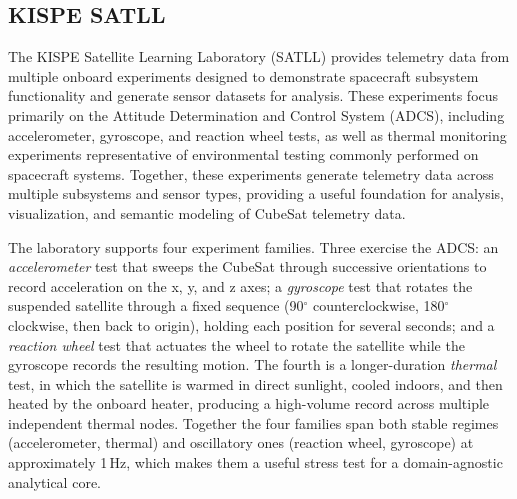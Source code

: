 \documentclass[conference]{IEEEtran}
\begin{document}
\subsection{KISPE SATLL}

The KISPE Satellite Learning Laboratory (SATLL) provides telemetry data from multiple onboard experiments designed to demonstrate spacecraft subsystem functionality and generate sensor datasets for analysis. These experiments focus primarily on the Attitude Determination and Control System (ADCS), including accelerometer, gyroscope, and reaction wheel tests, as well as thermal monitoring experiments representative of environmental testing commonly performed on spacecraft systems. Together, these experiments generate telemetry data across multiple subsystems and sensor types, providing a useful foundation for analysis, visualization, and semantic modeling of CubeSat telemetry data.

The laboratory supports four experiment families. Three exercise the ADCS: an \emph{accelerometer} test that sweeps the CubeSat through successive orientations to record acceleration on the x, y, and z axes; a \emph{gyroscope} test that rotates the suspended satellite through a fixed sequence (90$^\circ$ counterclockwise, 180$^\circ$ clockwise, then back to origin), holding each position for several seconds; and a \emph{reaction wheel} test that actuates the wheel to rotate the satellite while the gyroscope records the resulting motion. The fourth is a longer-duration \emph{thermal} test, in which the satellite is warmed in direct sunlight, cooled indoors, and then heated by the onboard heater, producing a high-volume record across multiple independent thermal nodes. Together the four families span both stable regimes (accelerometer, thermal) and oscillatory ones (reaction wheel, gyroscope) at approximately 1\,Hz, which makes them a useful stress test for a domain-agnostic analytical core.

\end{document}
